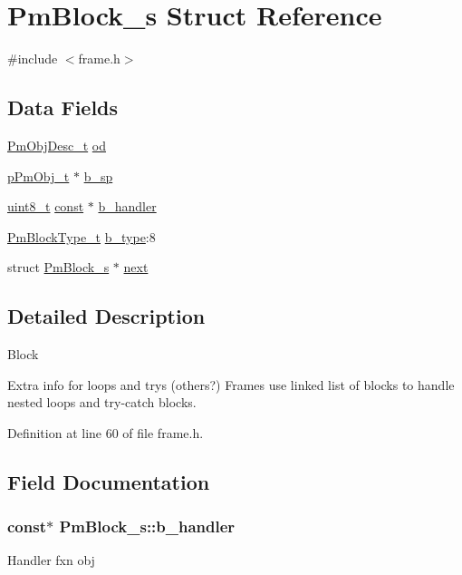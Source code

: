 \hypertarget{struct_pm_block__s}{\section{Pm\-Block\-\_\-s Struct Reference}
\label{struct_pm_block__s}
}


{\ttfamily \#include $<$frame.\-h$>$}

\subsection*{Data Fields}
\begin{DoxyCompactItemize}
\item 
\hyperlink{obj_8h_a72d816790acd8eb550fb25268c2b3489}{Pm\-Obj\-Desc\-\_\-t} \hyperlink{struct_pm_block__s_a6af1b8ef7cc84f8b059fae997d53ca83}{od}
\item 
\hyperlink{obj_8h_af293479fa3f9d92b941ee7445ad3960e}{p\-Pm\-Obj\-\_\-t} $\ast$ \hyperlink{struct_pm_block__s_aac9e69c5a2cbde6bc97bdf08fb8ea529}{b\-\_\-sp}
\item 
\hyperlink{stdint_8h_aba7bc1797add20fe3efdf37ced1182c5}{uint8\-\_\-t} \hyperlink{group___n_a_m_e_ga7ae6d0e43244213b34de2c2b9aa30da6}{const} $\ast$ \hyperlink{struct_pm_block__s_a27ab7b06244a62cafa75e1b3e75cb6a1}{b\-\_\-handler}
\item 
\hyperlink{frame_8h_af5cbd6b76bfefbc6c50fff4db03db82d}{Pm\-Block\-Type\-\_\-t} \hyperlink{struct_pm_block__s_a9b5a5f848eac48f04f642ca6b1eedb75}{b\-\_\-type}\-:8
\item 
struct \hyperlink{struct_pm_block__s}{Pm\-Block\-\_\-s} $\ast$ \hyperlink{struct_pm_block__s_a7f01b85ab24c835cf8c953a7b8767f6c}{next}
\end{DoxyCompactItemize}


\subsection{Detailed Description}
Block

Extra info for loops and trys (others?) Frames use linked list of blocks to handle nested loops and try-\/catch blocks. 

Definition at line 60 of file frame.\-h.



\subsection{Field Documentation}
\hypertarget{struct_pm_block__s_a27ab7b06244a62cafa75e1b3e75cb6a1}{
\subsubsection[{b\-\_\-handler}]{ {\bf const}$\ast$ Pm\-Block\-\_\-s\-::b\-\_\-handler}}\label{struct_pm_block__s_a27ab7b06244a62cafa75e1b3e75cb6a1}
Handler fxn obj 

